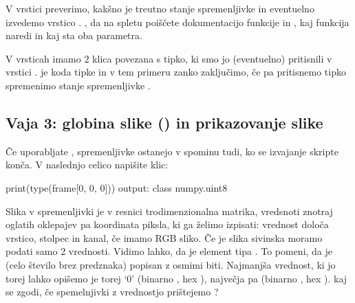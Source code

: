 \documentclass[letterpaper,10pt,english]{sphinxmanual}
\begin{document}
\sphinxAtStartPar
V vrstici  preverimo, kakšno je treutno stanje spremenljivke  in eventuelno izvedemo vrstico . , da na spletu poiščete dokumentacijo  funkcije  in , kaj funkcija naredi in kaj sta oba parametra.

\begin{sphinxVerbatim}[commandchars=\\\{\}]
       
       
           
\end{sphinxVerbatim}

\sphinxAtStartPar
V vrsticah  imamo 2 klica povezana s tipko, ki smo jo (eventuelno) pritisnili v vrstici .  je koda tipke  in v tem primeru zanko zaključimo, če pa pritisnemo tipko  spremenimo  stanje spremenljivke .


\subsection{Vaja 3: globina slike () in prikazovanje slike}
\label{\detokenize{uvod_py_opencv:vaja-3-globina-slike-image-depth-in-prikazovanje-slike}}
\sphinxAtStartPar
Če uporabljate , spremenljivke ostanejo v spominu tudi, ko se izvajanje skripte konča. V naslednjo celico napišite klic:

\begin{sphinxVerbatim}[commandchars=\\\{\}]
print(type(frame[0, 0, 0]))
output: \PYGZlt{}class \PYGZsq{}numpy.uint8\PYGZsq{}\PYGZgt{}
\end{sphinxVerbatim}

\sphinxAtStartPar
Slika v spremenljivki  je v resnici trodimenzionalna matrika, vredsnoti znotraj oglatih oklepajev pa koordinata piksla, ki ga želimo izpisati:  vrednost določa vrstico,  stolpec in  kanal, če imamo RGB sliko. Če je slika sivinska moramo podati samo 2 vrednosti. Vidimo lahko, da je element tipa . To pomeni, da je  (celo število brez predznaka) popisan z osmimi biti. Najmanjša vrednost, ki jo torej lahko opišemo je torej ‘0’ (binarno , hex ), največja pa  (binarno , hex ).  kaj se zgodi, če  spemelnjivki z vrednostjo  prištejemo ?
\end{document}
